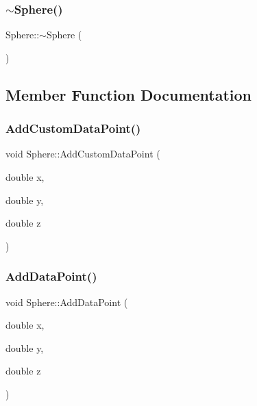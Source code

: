 \mbox{\label{class_sphere_a569c071e50a3e11f678630ee1a17737e}} 
\subsubsection{\texorpdfstring{$\sim$Sphere()}{~Sphere()}\hspace{0.1cm}{\footnotesize\ttfamily [3/3]}}
{\footnotesize\ttfamily Sphere\+::$\sim$\+Sphere (\begin{DoxyParamCaption}{ }\end{DoxyParamCaption})}



\subsection{Member Function Documentation}
\mbox{\label{class_sphere_a5990e060e4c7244b7fc57f0c2f675bf1}} 
\subsubsection{\texorpdfstring{AddCustomDataPoint()}{AddCustomDataPoint()}}
{\footnotesize\ttfamily void Sphere\+::\+Add\+Custom\+Data\+Point (\begin{DoxyParamCaption}\item[{double}]{x,  }\item[{double}]{y,  }\item[{double}]{z }\end{DoxyParamCaption})}

\mbox{\label{class_sphere_a6ee40854809d5d82480eabdbd677432f}} 
\subsubsection{\texorpdfstring{AddDataPoint()}{AddDataPoint()}}
{\footnotesize\ttfamily void Sphere\+::\+Add\+Data\+Point (\begin{DoxyParamCaption}\item[{double}]{x,  }\item[{double}]{y,  }\item[{double}]{z }\end{DoxyParamCaption})}

